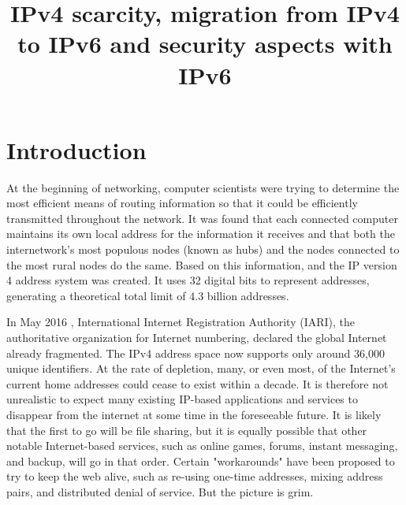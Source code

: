 \documentclass[conference]{IEEEtran}
\begin{document}
\title{IPv4 scarcity, migration from IPv4 to IPv6 and security aspects with IPv6}

\author{
  \and
  \and
}

\maketitle

\section{Introduction}
At the beginning of networking, computer scientists were trying to determine the most efficient means of routing information so that it could be efficiently transmitted throughout the network. It was found that each connected computer maintains its own local address for the information it receives and that both the internetwork's most populous nodes (known as hubs) and the nodes connected to the most rural nodes do the same. Based on this information, and the IP version 4 address system was created. It uses 32 digital bits to represent addresses, generating a theoretical total limit of 4.3 billion addresses.

In May 2016 , International Internet Registration Authority (IARI), the authoritative organization for Internet numbering, declared the global Internet already fragmented. The IPv4 address space now supports only around 36,000 unique identifiers. At the rate of depletion, many, or even most, of the Internet's current home addresses could cease to exist within a decade. It is therefore not unrealistic to expect many existing IP-based applications and services to disappear from the internet at some time in the foreseeable future. It is likely that the first to go will be file sharing, but it is equally possible that other notable Internet-based services, such as online games, forums, instant messaging, and backup, will go in that order. Certain "workarounds" have been proposed to try to keep the web alive, such as re-using one-time addresses, mixing address pairs, and distributed denial of service. But the picture is grim.
\end{document}
